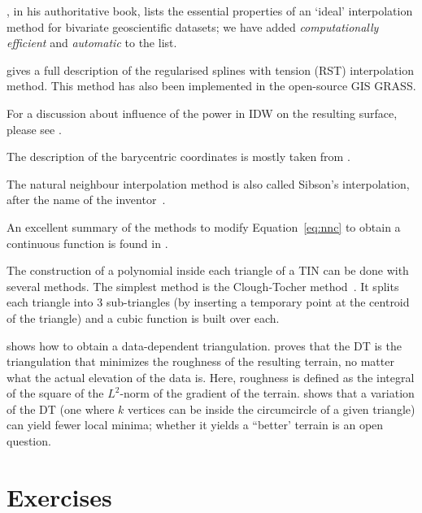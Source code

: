 \citet{Watson92}, in his authoritative book, lists the essential properties of an `ideal' interpolation method for bivariate geoscientific datasets; we have added \emph{computationally efficient} and \emph{automatic} to the list.

\citet{Mitasova93} gives a full description of the regularised splines with tension (RST) interpolation method.
This method has also been implemented in the open-source GIS GRASS\@.

For a discussion about influence of the power in IDW on the resulting surface, please see \citet{Watson92}.

The description of the barycentric coordinates is mostly taken from \citet{Eberly18}.

The natural neighbour interpolation method is also called Sibson's interpolation, after the name of the inventor~\citep{Sibson81}. 

An excellent summary of the methods to modify Equation~\ref{eq:nnc} to obtain a continuous function is found in \citet{Flototto03}. 

The construction of a polynomial inside each triangle of a TIN can be done with several methods. 
The simplest method is the Clough-Tocher method~\citep{Clough65,Farin85}.
It splits each triangle into 3 sub-triangles (by inserting a temporary point at the centroid of the triangle) and a cubic function is built over each.

\citet{Dyn90} shows how to obtain a data-dependent triangulation.
\citet{Rippa90} proves that the DT is the triangulation that minimizes the roughness of the resulting terrain, no matter what the actual elevation of the data is. 
Here, roughness is defined as the integral of the square of the $L^2$-norm of the gradient of the terrain.
\citet{Gudmundsson02} shows that a variation of the DT (one where $k$ vertices can be inside the circumcircle of a given triangle) can yield fewer local minima; whether it yields a ``better' terrain is an open question.


%
\newpage
\section{Exercises}

